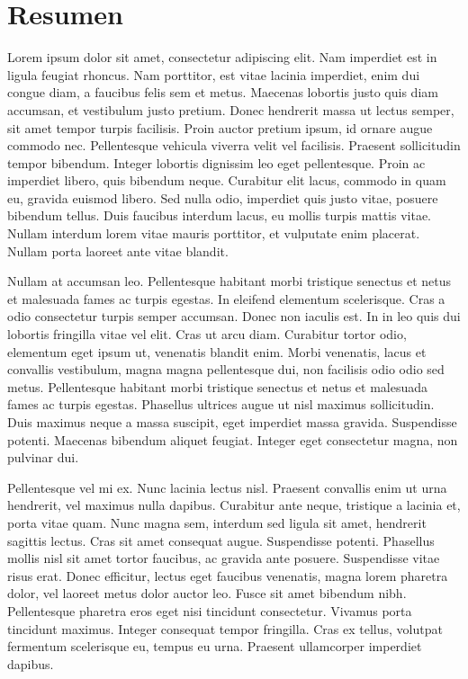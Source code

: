 %
\chapter*{Resumen} \label{resumen}
\pagestyle{empty}
\thispagestyle{empty} 

Lorem ipsum dolor sit amet, consectetur adipiscing elit. Nam imperdiet est in ligula feugiat rhoncus. Nam porttitor, est vitae lacinia imperdiet, enim dui congue diam, a faucibus felis sem et metus. Maecenas lobortis justo quis diam accumsan, et vestibulum justo pretium. Donec hendrerit massa ut lectus semper, sit amet tempor turpis facilisis. Proin auctor pretium ipsum, id ornare augue commodo nec. Pellentesque vehicula viverra velit vel facilisis. Praesent sollicitudin tempor bibendum. Integer lobortis dignissim leo eget pellentesque. Proin ac imperdiet libero, quis bibendum neque. Curabitur elit lacus, commodo in quam eu, gravida euismod libero. Sed nulla odio, imperdiet quis justo vitae, posuere bibendum tellus. Duis faucibus interdum lacus, eu mollis turpis mattis vitae. Nullam interdum lorem vitae mauris porttitor, et vulputate enim placerat. Nullam porta laoreet ante vitae blandit.

Nullam at accumsan leo. Pellentesque habitant morbi tristique senectus et netus et malesuada fames ac turpis egestas. In eleifend elementum scelerisque. Cras a odio consectetur turpis semper accumsan. Donec non iaculis est. In in leo quis dui lobortis fringilla vitae vel elit. Cras ut arcu diam. Curabitur tortor odio, elementum eget ipsum ut, venenatis blandit enim. Morbi venenatis, lacus et convallis vestibulum, magna magna pellentesque dui, non facilisis odio odio sed metus. Pellentesque habitant morbi tristique senectus et netus et malesuada fames ac turpis egestas. Phasellus ultrices augue ut nisl maximus sollicitudin. Duis maximus neque a massa suscipit, eget imperdiet massa gravida. Suspendisse potenti. Maecenas bibendum aliquet feugiat. Integer eget consectetur magna, non pulvinar dui.

Pellentesque vel mi ex. Nunc lacinia lectus nisl. Praesent convallis enim ut urna hendrerit, vel maximus nulla dapibus. Curabitur ante neque, tristique a lacinia et, porta vitae quam. Nunc magna sem, interdum sed ligula sit amet, hendrerit sagittis lectus. Cras sit amet consequat augue. Suspendisse potenti. Phasellus mollis nisl sit amet tortor faucibus, ac gravida ante posuere. Suspendisse vitae risus erat. Donec efficitur, lectus eget faucibus venenatis, magna lorem pharetra dolor, vel laoreet metus dolor auctor leo. Fusce sit amet bibendum nibh. Pellentesque pharetra eros eget nisi tincidunt consectetur. Vivamus porta tincidunt maximus. Integer consequat tempor fringilla. Cras ex tellus, volutpat fermentum scelerisque eu, tempus eu urna. Praesent ullamcorper imperdiet dapibus.

